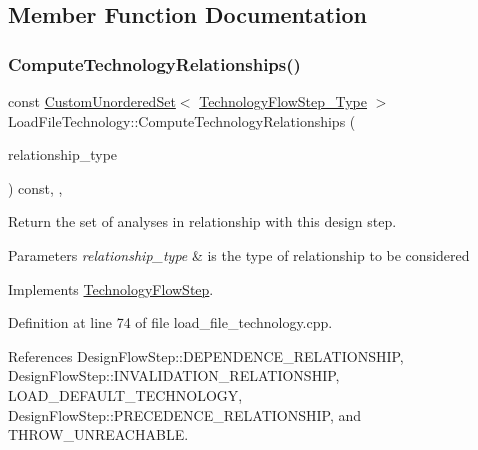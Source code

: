 \subsection{Member Function Documentation}
\mbox{\label{classLoadFileTechnology_ae698944e39fc273e5821302bbc45e62e}} 
\subsubsection{\texorpdfstring{Compute\+Technology\+Relationships()}{ComputeTechnologyRelationships()}}
{\footnotesize\ttfamily const \hyperlink{classCustomUnorderedSet}{Custom\+Unordered\+Set}$<$ \hyperlink{technology__flow__step_8hpp_a65208cfec963a7d7def292f9db428292}{Technology\+Flow\+Step\+\_\+\+Type} $>$ Load\+File\+Technology\+::\+Compute\+Technology\+Relationships (\begin{DoxyParamCaption}\item[{const \hyperlink{classDesignFlowStep_a723a3baf19ff2ceb77bc13e099d0b1b7}{Design\+Flow\+Step\+::\+Relationship\+Type}}]{relationship\+\_\+type }\end{DoxyParamCaption}) const\hspace{0.3cm}{\ttfamily [override]}, {\ttfamily [protected]}, {\ttfamily [virtual]}}



Return the set of analyses in relationship with this design step. 


\begin{DoxyParams}{Parameters}
{\em relationship\+\_\+type} & is the type of relationship to be considered \\
\hline
\end{DoxyParams}


Implements \hyperlink{classTechnologyFlowStep_ab543169c9b0143c8ae8831d765519075}{Technology\+Flow\+Step}.



Definition at line 74 of file load\+\_\+file\+\_\+technology.\+cpp.



References Design\+Flow\+Step\+::\+D\+E\+P\+E\+N\+D\+E\+N\+C\+E\+\_\+\+R\+E\+L\+A\+T\+I\+O\+N\+S\+H\+IP, Design\+Flow\+Step\+::\+I\+N\+V\+A\+L\+I\+D\+A\+T\+I\+O\+N\+\_\+\+R\+E\+L\+A\+T\+I\+O\+N\+S\+H\+IP, L\+O\+A\+D\+\_\+\+D\+E\+F\+A\+U\+L\+T\+\_\+\+T\+E\+C\+H\+N\+O\+L\+O\+GY, Design\+Flow\+Step\+::\+P\+R\+E\+C\+E\+D\+E\+N\+C\+E\+\_\+\+R\+E\+L\+A\+T\+I\+O\+N\+S\+H\+IP, and T\+H\+R\+O\+W\+\_\+\+U\+N\+R\+E\+A\+C\+H\+A\+B\+LE.

